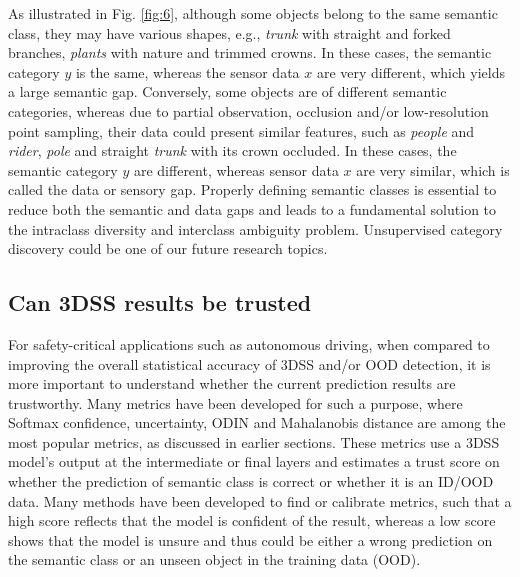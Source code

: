 \documentclass[journal]{IEEEtran}
\begin{document}
As illustrated in Fig. \ref{fig:6}, although some objects belong to the same semantic class, they may have various shapes, e.g., \textit{trunk} with straight and forked branches, \textit{plants} with nature and trimmed crowns. In these cases, the semantic category $y$ is the same, whereas the sensor data $x$ are very different, which yields a large semantic gap. Conversely, some objects are of different semantic categories, whereas due to partial observation, occlusion and/or low-resolution point sampling, their data could present similar features, such as \textit{people} and \textit{rider}, \textit{pole} and straight \textit{trunk} with its crown occluded. In these cases, the semantic category $y$ are different, whereas sensor data $x$ are very similar, which is called the data or sensory gap. Properly defining semantic classes is essential to reduce both the semantic and data gaps and leads to a fundamental solution to the intraclass diversity and interclass ambiguity problem. Unsupervised category discovery could be one of our future research topics.




\subsection{Can 3DSS results be trusted}

For safety-critical applications such as autonomous driving, when compared to improving the overall statistical accuracy of 3DSS and/or OOD detection, it is more important to understand whether the current prediction results are trustworthy. Many metrics have been developed for such a purpose, where Softmax confidence, uncertainty, ODIN and Mahalanobis distance are among the most popular metrics, as discussed in earlier sections. These metrics use a 3DSS model's output at the intermediate or final layers and estimates a trust score on whether the prediction of semantic class is correct or whether it is an ID/OOD data. Many methods have been developed to find or calibrate metrics, such that a high score reflects that the model is confident of the result, whereas a low score shows that the model is unsure and thus could be either a wrong prediction on the semantic class or an unseen object in the training data (OOD). 
\end{document}

